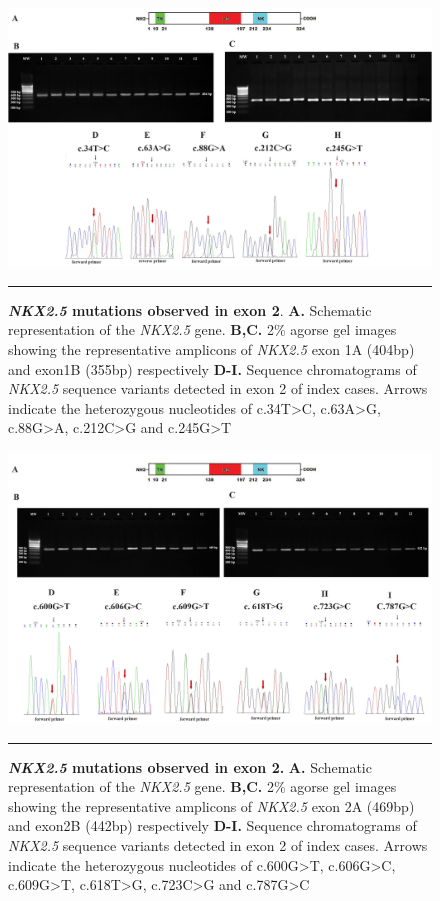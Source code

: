 \begin{refsection}
\begin{figure}
\centering
\includegraphics[scale=0.95,keepaspectratio]{Figures/Figure5_1.pdf}
\rule{35em}{0.5pt}
\caption{\textbf{\textit{NKX2.5} mutations observed in exon 2}. \textbf{A.} Schematic representation of the \textit{NKX2.5} gene. \textbf{B,C.} 2\% agorse gel images showing the representative amplicons of \textit{NKX2.5} exon 1A (404bp) and exon1B (355bp) respectively \textbf{D-I.} Sequence chromatograms of \textit{NKX2.5} sequence variants detected in exon 2 of index cases. Arrows indicate the heterozygous nucleotides of c.34T>C, c.63A>G, c.88G>A, c.212C>G and c.245G>T}
\label{fig:5_1}
\end{figure}

\begin{figure}
\centering
\includegraphics[scale=0.9,keepaspectratio]{Figures/Figure5_2.pdf}
\rule{35em}{0.5pt}
\caption{\textbf{\textit{NKX2.5} mutations observed in exon 2.} \textbf{A.} Schematic representation of the \textit{NKX2.5} gene. \textbf{B,C.} 2\% agorse gel images showing the representative amplicons of \textit{NKX2.5} exon 2A (469bp) and exon2B (442bp) respectively \textbf{D-I.} Sequence chromatograms of \textit{NKX2.5} sequence variants detected in exon 2 of index cases. Arrows indicate the heterozygous nucleotides of c.600G>T, c.606G>C, c.609G>T, c.618T>G, c.723C>G and c.787G>C}
\label{fig:5_2}
\end{figure}


\end{refsection}
